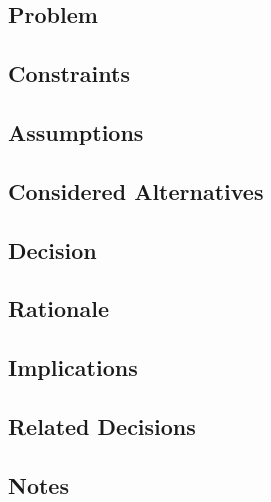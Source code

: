 \subsection*{Problem}

\subsection*{Constraints}

\subsection*{Assumptions}

\subsection*{Considered Alternatives}

\subsection*{Decision}

\subsection*{Rationale}

\subsection*{Implications}

\subsection*{Related Decisions}

\subsection*{Notes}